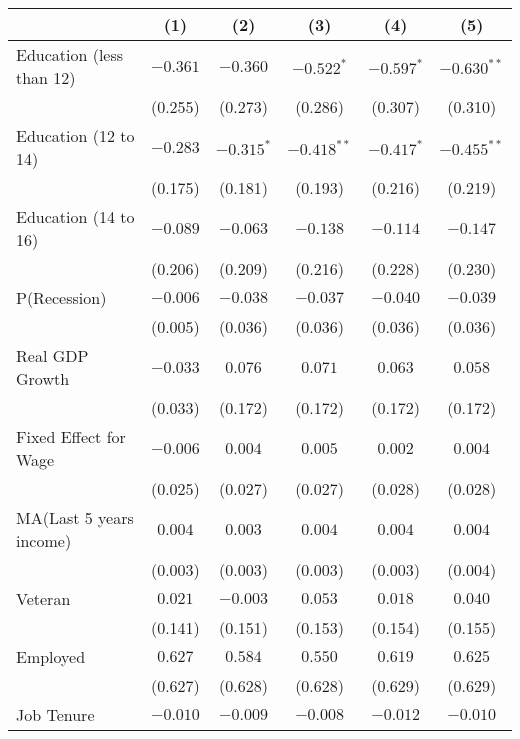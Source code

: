 \documentclass[12pt]{article}
\begin{document}
\begin{table}[H]
\begin{tabular}{lccccc}
\toprule
                    & (1)     & (2)   & (3)    & (4)      & (5)         \\
\midrule
Education (less than 12)                & $-0.361$  & $-0.360$    & $-0.522^{*}$  & $-0.597^{*}$   & $-0.630^{**}$    \\
                    & (0.255)   & (0.273)     & (0.286)   & (0.307)    & (0.310)     \\
Education (12 to 14)                & $-0.283$  & $-0.315^{*}$    & $-0.418^{**}$  & $-0.417^{*}$   & $-0.455^{**}$    \\
                    & (0.175)   & (0.181)     & (0.193)   & (0.216)    & (0.219)     \\
Education (14 to 16)                & $-0.089$  & $-0.063$    & $-0.138$  & $-0.114$   & $-0.147$    \\
                    & (0.206)   & (0.209)     & (0.216)   & (0.228)    & (0.230)     \\
P(Recession)            & $-0.006$   & $-0.038$     & $-0.037$   & $-0.040$    & $-0.039$     \\
                    & (0.005)   & (0.036)     & (0.036)   & (0.036)    & (0.036)     \\
Real GDP Growth            & $-0.033$   & $0.076$     & $0.071$   & $0.063$    & $0.058$     \\
                    & (0.033)   & (0.172)     & (0.172)   & (0.172)    & (0.172)     \\
Fixed Effect for Wage         & $-0.006$   & $0.004$     & $0.005$   & $0.002$    & $0.004$     \\
                    & (0.025)   & (0.027)     & (0.027)   & (0.028)    & (0.028)     \\
MA(Last 5 years income)              & $0.004$   & $0.003$     & $0.004$   & $0.004$    & $0.004$     \\
                    & (0.003)   & (0.003)     & (0.003)   & (0.003)    & (0.004)     \\
Veteran             & $0.021$   & $-0.003$     & $0.053$   & $0.018$    & $0.040$     \\
                    & (0.141)   & (0.151)     & (0.153)   & (0.154)    & (0.155)     \\
Employed                 & $0.627$   & $0.584$     & $0.550$   & $0.619$    & $0.625$     \\
                    & (0.627)   & (0.628)     & (0.628)   & (0.629)    & (0.629)     \\
Job Tenure              & $-0.010$   & $-0.009$     & $-0.008$   & $-0.012$    & $-0.010$     \\

\end{tabular}
\end{table}
\end{document}
